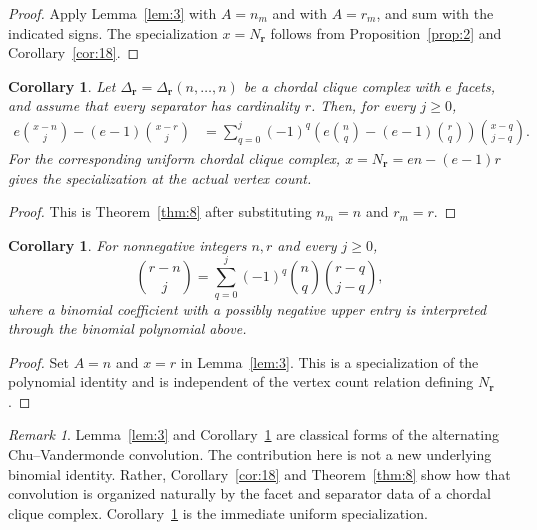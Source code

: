 \documentclass[11pt]{amsart}
\newtheorem{corollary}[theorem]{Corollary}
\theoremstyle{definition}
\theoremstyle{remark}
\newtheorem{remark}[theorem]{Remark}
\begin{document}
	\begin{proof}
		Apply Lemma~\ref{lem:3} with $A=n_m$ and with $A=r_m$, and sum with the indicated signs. The specialization $x=N_{\mathbf r}$ follows from Proposition~\ref{prop:2} and Corollary~\ref{cor:18}.
	\end{proof}
	
	\begin{corollary}\label{cor:19}
		Let $\Delta_{\mathbf r}=\Delta_{\mathbf r}(n,\ldots,n)$ be a chordal clique complex with $e$ facets, and assume that every separator has cardinality $r$. Then, for every $j\geq0$,
		\begin{align*}
			e\binom{x-n}{j}-(e-1)\binom{x-r}{j}
			&=
			\sum_{q=0}^{j}(-1)^q
			\left(
			e\binom{n}{q}-(e-1)\binom{r}{q}
			\right)
			\binom{x-q}{j-q}.
		\end{align*}
		For the corresponding uniform chordal clique complex,
		$x=N_{\mathbf r}=en-(e-1)r$ gives the specialization at the actual vertex count.
	\end{corollary}
	
	\begin{proof}
		This is Theorem~\ref{thm:8} after substituting $n_m=n$ and $r_m=r$.
	\end{proof}
	
	\begin{corollary}\label{cor:20}
		For nonnegative integers $n,r$ and every $j\geq0$,
		\[
		\binom{r-n}{j}
		=
		\sum_{q=0}^{j}(-1)^q\binom{n}{q}\binom{r-q}{j-q},
		\]
		where a binomial coefficient with a possibly negative upper entry is interpreted through the binomial polynomial above.
	\end{corollary}
	
	\begin{proof}
		Set $A=n$ and $x=r$ in Lemma~\ref{lem:3}. This is a specialization of the polynomial identity and is independent of the vertex count relation defining $N_{\mathbf r}$.
	\end{proof}
	
	\begin{remark}\label{rem:6}
		Lemma~\ref{lem:3} and Corollary~\ref{cor:20} are classical forms of the alternating Chu--Vandermonde convolution. The contribution here is not a new underlying binomial identity. Rather, Corollary~\ref{cor:18} and Theorem~\ref{thm:8} show how that convolution is organized naturally by the facet and separator data of a chordal clique complex. Corollary~\ref{cor:19} is the immediate uniform specialization.
	\end{remark}
	
\end{document}
